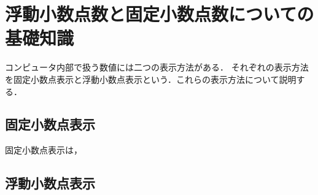 \chapter{浮動小数点数と固定小数点数についての基礎知識}
コンピュータ内部で扱う数値には二つの表示方法がある．
それぞれの表示方法を固定小数点表示と浮動小数点表示という．これらの表示方法について説明する．

\section{固定小数点表示}
固定小数点表示は，

\section{浮動小数点表示}